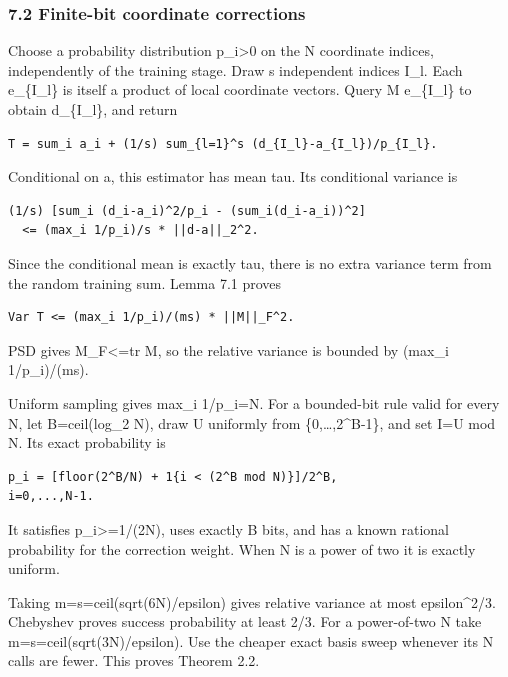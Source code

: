 \documentclass[
  10pt,
]{article}
\begin{document}
\subsubsection{7.2 Finite-bit coordinate
corrections}\label{finite-bit-coordinate-corrections}

Choose a probability distribution p\_i\textgreater0 on the N coordinate
indices, independently of the training stage. Draw s independent indices
I\_l. Each e\_\{I\_l\} is itself a product of local coordinate vectors.
Query M e\_\{I\_l\} to obtain d\_\{I\_l\}, and return

\begin{verbatim}
T = sum_i a_i + (1/s) sum_{l=1}^s (d_{I_l}-a_{I_l})/p_{I_l}.
\end{verbatim}

Conditional on a, this estimator has mean tau. Its conditional variance
is

\begin{verbatim}
(1/s) [sum_i (d_i-a_i)^2/p_i - (sum_i(d_i-a_i))^2]
  <= (max_i 1/p_i)/s * ||d-a||_2^2.
\end{verbatim}

Since the conditional mean is exactly tau, there is no extra variance
term from the random training sum. Lemma 7.1 proves

\begin{verbatim}
Var T <= (max_i 1/p_i)/(ms) * ||M||_F^2.
\end{verbatim}

PSD gives \textbar\textbar M\textbar\textbar\_F\textless=tr M, so the
relative variance is bounded by (max\_i 1/p\_i)/(ms).

Uniform sampling gives max\_i 1/p\_i=N. For a bounded-bit rule valid for
every N, let B=ceil(log\_2 N), draw U uniformly from
\{0,\ldots,2\^{}B-1\}, and set I=U mod N. Its exact probability is

\begin{verbatim}
p_i = [floor(2^B/N) + 1{i < (2^B mod N)}]/2^B,
i=0,...,N-1.
\end{verbatim}

It satisfies p\_i\textgreater=1/(2N), uses exactly B bits, and has a
known rational probability for the correction weight. When N is a power
of two it is exactly uniform.

Taking m=s=ceil(sqrt(6N)/epsilon) gives relative variance at most
epsilon\^{}2/3. Chebyshev proves success probability at least 2/3. For a
power-of-two N take m=s=ceil(sqrt(3N)/epsilon). Use the cheaper exact
basis sweep whenever its N calls are fewer. This proves Theorem 2.2.
\end{document}
